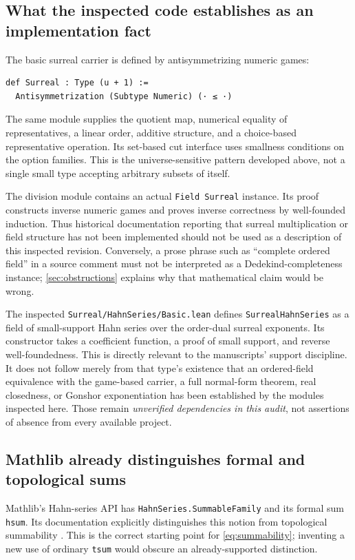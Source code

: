 \documentclass[11pt,letterpaper]{article}
\numberwithin{equation}{section}
\theoremstyle{definition}
\theoremstyle{remark}
\begin{document}
\subsection{What the inspected code establishes as an implementation fact}
The basic surreal carrier is defined by antisymmetrizing numeric games:
\begin{lstlisting}
def Surreal : Type (u + 1) :=
  Antisymmetrization (Subtype Numeric) (· ≤ ·)
\end{lstlisting}
The same module supplies the quotient map, numerical equality of representatives, a linear order, additive structure, and a choice-based representative operation. Its set-based cut interface uses smallness conditions on the option families. This is the universe-sensitive pattern developed above, not a single small type accepting arbitrary subsets of itself.

The division module contains an actual \texttt{Field Surreal} instance. Its proof constructs inverse numeric games and proves inverse correctness by well-founded induction. Thus historical documentation reporting that surreal multiplication or field structure has not been implemented should not be used as a description of this inspected revision. Conversely, a prose phrase such as ``complete ordered field'' in a source comment must not be interpreted as a Dedekind-completeness instance; \cref{sec:obstructions} explains why that mathematical claim would be wrong.

The inspected \texttt{Surreal/HahnSeries/Basic.lean} defines \texttt{SurrealHahnSeries} as a field of small-support Hahn series over the order-dual surreal exponents. Its constructor takes a coefficient function, a proof of small support, and reverse well-foundedness. This is directly relevant to the manuscripts' support discipline. It does not follow merely from that type's existence that an ordered-field equivalence with the game-based carrier, a full normal-form theorem, real closedness, or Gonshor exponentiation has been established by the modules inspected here. Those remain \emph{unverified dependencies in this audit}, not assertions of absence from every available project.

\subsection{Mathlib already distinguishes formal and topological sums}
Mathlib's Hahn-series API has \texttt{HahnSeries.SummableFamily} and its formal sum \texttt{hsum}. Its documentation explicitly distinguishes this notion from topological summability \cite{MathlibHahn}. This is the correct starting point for \eqref{eq:summability}; inventing a new use of ordinary \texttt{tsum} would obscure an already-supported distinction.
\end{document}
